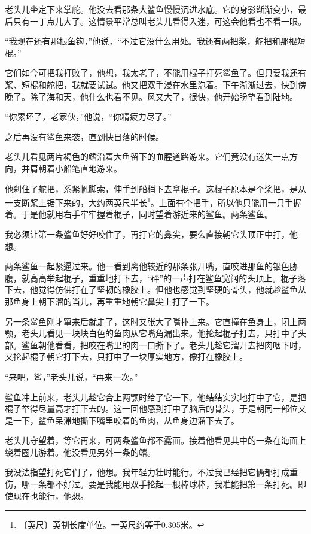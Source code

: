 \documentclass[12pt,UTF-8,openany]{ctexbook}
\begin{document}
\begin{large}
    老头儿坐定下来掌舵。他没去看那条大鲨鱼慢慢沉进水底。它的身影渐渐变小，最后只有一丁点儿大了。这情景平常总叫老头儿看得入迷，可这会他看也不看一眼。
    
    “我现在还有那根鱼钩，”他说，“不过它没什么用处。我还有两把桨，舵把和那根短棍。”
    
    它们如今可把我打败了，他想，我太老了，不能用棍子打死鲨鱼了。但只要我还有桨、短棍和舵把，我就要试试。他又把双手浸在水里泡着。下午渐渐过去，快到傍晚了。除了海和天，他什么也看不见。风又大了，很快，他开始盼望看到陆地。
    
    “你累坏了，老家伙，”他说，“你精疲力尽了。”
    
    之后再没有鲨鱼来袭，直到快日落的时候。
    
    老头儿看见两片褐色的鳍沿着大鱼留下的血腥道路游来。它们竟没有迷失一点方向，并肩朝着小船笔直地游来。
    
    他刹住了舵把，系紧帆脚索，伸手到船梢下去拿棍子。这棍子原本是个桨把，是从一支断桨上锯下来的，大约两英尺半长\footnote{〔英尺〕英制长度单位。一英尺约等于0.305米。}。上面有个把手，所以他只能用一只手握着。于是他就用右手牢牢握着棍子，同时望着游近来的鲨鱼。两条鲨鱼。
    
    我必须让第一条鲨鱼好好咬住了，再打它的鼻尖，要么直接朝它头顶正中打，他想。
    
    两条鲨鱼一起紧逼过来。他一看到离他较近的那条张开嘴，直咬进那鱼的银色胁腹，就高高举起棍子，重重地打下去，“砰”的一声打在鲨鱼宽阔的头顶上。棍子落下去，他觉得仿佛打在了坚韧的橡胶上。但他也感觉到坚硬的骨头，他就趁鲨鱼从那鱼身上朝下溜的当儿，再重重地朝它鼻尖上打了一下。
    
    另一条鲨鱼刚才窜来后就走了，这时又张大了嘴扑上来。它直撞在鱼身上，闭上两颚，老头儿看见一块块白色的鱼肉从它嘴角漏出来。他抡起棍子打去，只打中了头部。鲨鱼朝他看看，把咬在嘴里的肉一口撕下了。老头儿趁它溜开去把肉咽下时，又抡起棍子朝它打下去，只打中了一块厚实地方，像打在橡胶上。
    
    “来吧，鲨，”老头儿说，“再来一次。”
    
    鲨鱼冲上前来，老头儿趁它合上两颚时给了它一下。他结结实实地打中了它，是把棍子举得尽量高才打下去的。这一回他感到打中了脑后的骨头，于是朝同一部位又是一下，鲨鱼呆滞地撕下嘴里咬着的鱼肉，从鱼身边溜下去了。
    
    老头儿守望着，等它再来，可两条鲨鱼都不露面。接着他看见其中的一条在海面上绕着圈儿游着。他没看见另外一条的鳍。
    
    我没法指望打死它们了，他想。我年轻力壮时能行。不过我已经把它俩都打成重伤，哪一条都不好过。要是我能用双手抡起一根棒球棒，我准能把第一条打死。即使现在也能行，他想。
    

\end{large}
\end{document}
